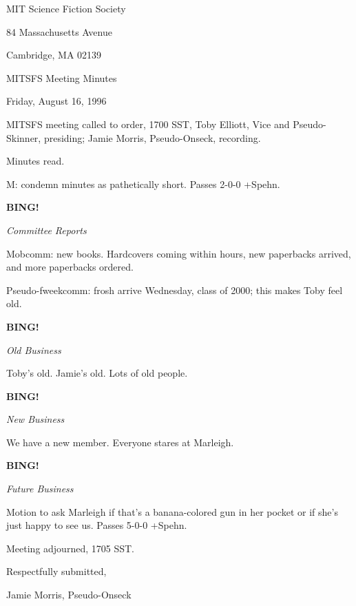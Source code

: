 \documentclass[12pt]{article}
\newcommand{\bing}{{\bf BING!} }
\newcommand{\goto}[1]{\bing \vskip 12pt \centerline{{\em{#1}}}}
\begin{document}
\begin{center}

MIT Science Fiction Society 

84 Massachusetts Avenue

Cambridge, MA 02139

\vspace{12pt}

MITSFS Meeting Minutes 

Friday, August 16, 1996

\end{center}
 
\vspace{18pt}

\setlength{\parskip}{6pt}

\noindent
MITSFS meeting called to order, 1700 SST,
Toby Elliott, Vice and Pseudo-Skinner, presiding; Jamie Morris, Pseudo-Onseck, recording.

Minutes read.

M: condemn minutes as pathetically short. Passes 2-0-0 +Spehn.

\goto{Committee Reports}

Mobcomm: new books. Hardcovers coming within hours, new paperbacks arrived, and more paperbacks ordered.

Pseudo-fweekcomm: frosh arrive Wednesday, class of 2000; this makes Toby feel old.

\goto{Old Business}

Toby's old. Jamie's old. Lots of old people.

\goto{New Business}

We have a new member. Everyone stares at Marleigh.

\goto{Future Business}

Motion to ask Marleigh if that's a banana-colored gun in her pocket or if she's just happy to see us. Passes 5-0-0 +Spehn.

\vspace{12pt}

\noindent
Meeting adjourned, 1705 SST.

\vspace{18pt}

\centerline{Respectfully submitted,}
\centerline{Jamie Morris, Pseudo-Onseck}
\end{document}
